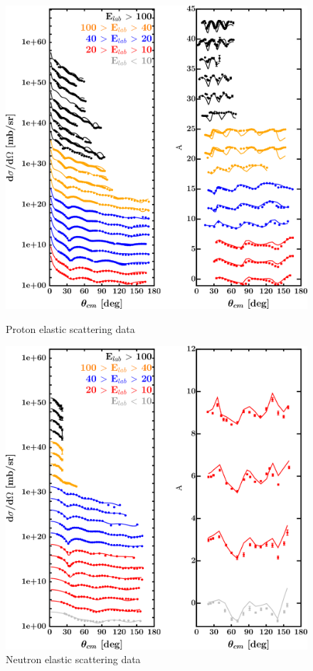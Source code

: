 \begin{figure}[H]
    \centering
    \begin{minipage}{0.45\textwidth}
        \centering
        \includegraphics[width=1.0\textwidth]{figures/ca40_protonElastic.png}
        \caption{Proton elastic scattering data}
        \label{DOMFitData_ca40_proton_elastic}
    \end{minipage}\hfill
    \begin{minipage}{0.45\textwidth}
        \centering
        \includegraphics[width=1.0\textwidth]{figures/ca40_neutronElastic.png}
        \caption{Neutron elastic scattering data}
        \label{DOMFitData_ca40_neutron_elastic}
    \end{minipage}
\end{figure}

